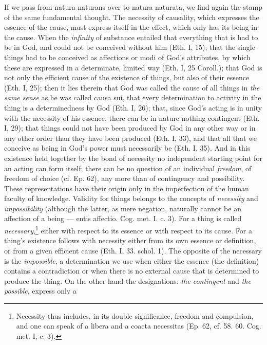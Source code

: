 \documentclass[12pt,a4paper,openany]{book}
\newcommand{\opage}[1]{\marginnote{\footnotesize\textit{[#1]}}}
\begin{document}
If we pass from natura naturans over to natura naturata, we find
again the stamp of the same fundamental thought. The necessity of causality, which
expresses the essence of the cause, must express itself in the effect, which only
has its being in the cause. When the \emph{infinity} of substance entailed that
everything that is had to be in God, and could not be conceived without
him (Eth. I, 15); that the single things had to be conceived as
affections or modi of God's attributes, by which these are
expressed in a determinate, limited way (Eth. I, 25 Coroll.);
that God is not only the efficient cause of the existence of things,
but also of their essence (Eth. I, 25); then it lies therein that God
was called the cause of all things in \emph{the same sense} as he was called causa
sui, that every determination to activity in the thing is a
determinedness by God (Eth. I, 26); that, since God's acting is in
unity with the necessity of his essence, there can be in nature
nothing contingent (Eth. I, 29); that things could not have been
produced by God in any other way or in any other order than they have been
produced (Eth. I, 33), and that all that we conceive as being in
God's power must necessarily be (Eth. I, 35). And in this existence
held together by the bond of necessity no
independent starting point for an acting can form itself; there can be no
question of an individual \emph{freedom}, of freedom of choice (cf. Ep. 62),
any more than of contingency and possibility. These representations
have their origin only in the imperfection of the human faculty of
knowledge. Validity for things belongs to the concepts of
\emph{necessity} and \emph{impossibility} (although the latter, as mere negation,
naturally cannot be an affection of a being --- entis
affectio. Cog. met. I. c. 3). For a thing is called
\opage{69}\setcounter{footnote}{0}\emph{necessary},\footnote{Necessity thus includes, in
its double significance, freedom and compulsion, and one can speak of a
libera and a coacta necessitas (Ep. 62, cf. 58. 60. Cog. met. I,
c. 3).} either with respect to its essence or with respect to its
cause. For a thing's existence follows with necessity either from
its own essence or definition, or from a given efficient
cause (Eth. I, 33. schol. 1). The opposite of the necessary
is the \emph{impossible}, a determination we use when either
the essence (the definition) contains a contradiction or when there is
no external cause that is determined to produce the thing.
On the other hand the designations: \emph{the contingent} and \emph{the possible}, express only a
\end{document}
